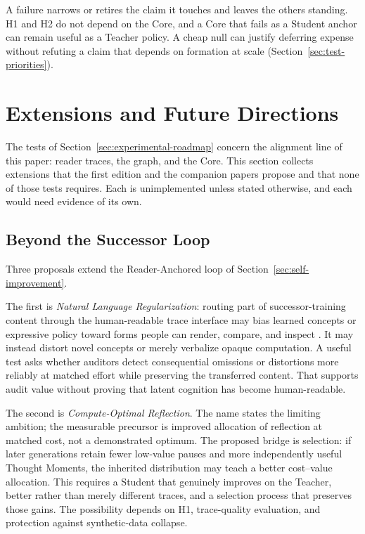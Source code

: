 \documentclass[11pt]{article}
\begin{document}
A failure narrows or retires the claim it touches and leaves the others
standing. H1 and H2 do not depend on the Core, and a Core that fails as a
Student anchor can remain useful as a Teacher policy. A cheap null can justify
deferring expense without refuting a claim that depends on formation at scale
(Section~\ref{sec:test-priorities}).

\section{Extensions and Future Directions}\label{sec:future-directions}

The tests of Section~\ref{sec:experimental-roadmap} concern the alignment
line of this paper: reader traces, the graph, and the Core. This section
collects extensions that the first edition and the companion papers propose
and that none of those tests requires. Each is unimplemented unless stated
otherwise, and each would need evidence of its own.

\subsection{Beyond the Successor Loop}\label{sec:loop-extensions}

Three proposals extend the Reader-Anchored loop of
Section~\ref{sec:self-improvement}.

The first is \emph{Natural Language Regularization}: routing part of
successor-training content through the human-readable trace interface may bias
learned concepts or expressive policy
toward forms people can render, compare, and inspect
\cite{westerberg2025superintelligence,westerberg2026entangled}. It may instead distort novel concepts or merely
verbalize opaque computation. A useful test asks whether auditors detect
consequential omissions or distortions more reliably at matched effort while
preserving the transferred content. That supports audit value without proving
that latent cognition has become human-readable.

				The second is \emph{Compute-Optimal Reflection}. The name
				states the limiting ambition; the measurable precursor is improved
				allocation of reflection at matched cost, not a demonstrated optimum.
				The proposed bridge is selection: if later generations retain fewer low-value
				pauses and more independently useful Thought Moments, the inherited
				distribution may teach a better cost--value allocation. This requires a
				Student that genuinely improves on the Teacher, better rather than merely
				different traces, and a selection process that preserves those gains. The
				possibility depends on H1, trace-quality evaluation, and protection against
				synthetic-data collapse.
\end{document}
